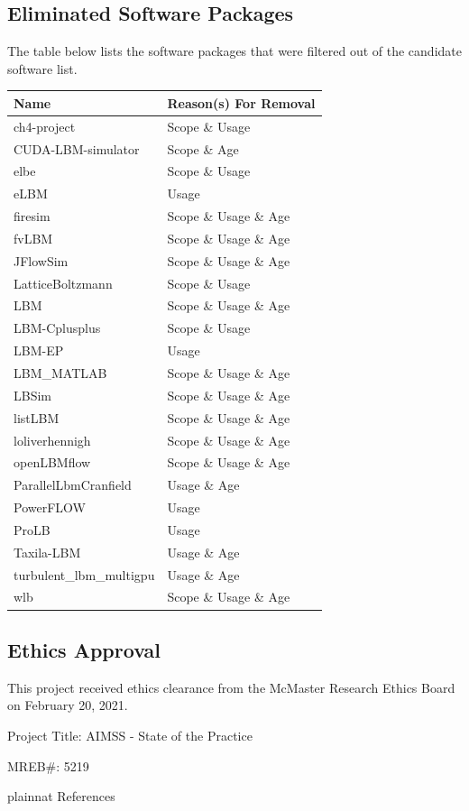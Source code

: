 \documentclass[12pt, notitlepage]{article}
\begin{document}
\begin{singlespace}
\subsection{Eliminated Software Packages}\label{eliminatedpackagessection}

The table below lists the software packages that were filtered out of the candidate software list. 

\begin{center}
	\begin{tabular}{ p{4cm}p{4cm}}
		\hline
		Name & Reason(s) For Removal\\
		\hline
		ch4-project&Scope \& Usage\\
		CUDA-LBM-simulator&Scope \& Age\\
		elbe&Scope \& Usage\\
		eLBM&Usage\\
		firesim&Scope \& Usage \& Age\\
		fvLBM&Scope \& Usage \& Age\\
		JFlowSim&Scope \& Usage \& Age\\
		LatticeBoltzmann&Scope \& Usage\\
		LBM&Scope \& Usage \& Age\\
		LBM-Cplusplus&Scope \& Usage\\
		LBM-EP&Usage\\
		LBM\_MATLAB&Scope \& Usage \& Age\\
		LBSim&Scope \& Usage \& Age\\
		listLBM&Scope \& Usage \& Age\\
		loliverhennigh&Scope \& Usage \& Age\\
		openLBMflow&Scope \& Usage \& Age\\
		ParallelLbmCranfield&Usage \& Age\\
		PowerFLOW&Usage\\
		ProLB&Usage\\
		Taxila-LBM&Usage \& Age\\
		turbulent\_lbm\_multigpu&Usage \& Age\\
		wlb&Scope \& Usage \& Age\\
		\hline
	\end{tabular}
	\label{eliminatedpackages}
\end{center}

\newpage

\subsection{Ethics Approval}
This project received ethics clearance from the McMaster Research Ethics Board on February 20, 2021.\newline


Project Title: AIMSS - State of the Practice\newline


MREB\#: 5219



\newpage

 {plainnat}
 {References}

\end{singlespace}
\end{document}
